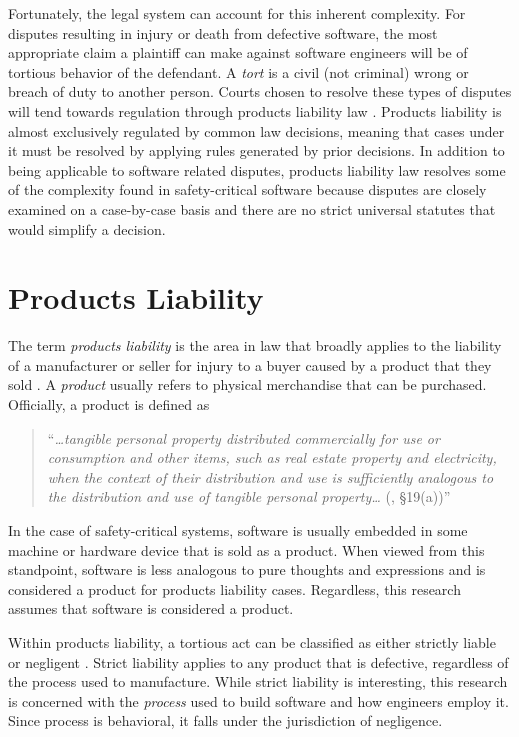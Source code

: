 \documentclass[12pt]{report}
\begin{document}
Fortunately, the legal system can account for this inherent complexity. For disputes resulting in injury or death from defective software, the most appropriate claim a plaintiff can make against software engineers will be of tortious behavior of the defendant. A \textit{tort} is a civil (not criminal) wrong or breach of duty to another person. Courts chosen to resolve these types of disputes will tend towards regulation through products liability law \cite{FAKE}. Products liability is almost exclusively regulated by common law decisions, meaning that cases under it must be resolved by applying rules generated by prior decisions. In addition to being applicable to software related disputes, products liability law resolves some of the complexity found in safety-critical software because disputes are closely examined on a case-by-case basis and there are no strict universal statutes that would simplify a decision.

\section{Products Liability} 
The term \textit{products liability} is the area in law that broadly applies to the liability of a manufacturer or seller for injury to a buyer caused by a product that they sold \cite{FAKE}. A \textit{product} usually refers to physical merchandise that can be purchased. Officially, a product is defined as 

\begin{quote}
``\textit{\ldots tangible personal property distributed commercially for use or consumption and other items, such as real estate property and electricity, when the context of their distribution and use is sufficiently analogous to the distribution and use of tangible personal property\ldots} (\cite{Rest3d}, \S19(a))'' 
\end{quote}

In the case of safety-critical systems, software is usually embedded in some machine or hardware device \cite{Leveson95} that is sold as a product. When viewed from this standpoint, software is less analogous to pure thoughts and expressions and is considered a product for products liability cases. Regardless, this research assumes that software is considered a product.

Within products liability, a tortious act can be classified as either strictly liable or negligent \cite{Turner99}. Strict liability applies to any product that is defective, regardless of the process used to manufacture. While strict liability is interesting, this research is concerned with the \textit{process} used to build software and how engineers employ it. Since process is behavioral, it falls under the jurisdiction of negligence.
\end{document}
